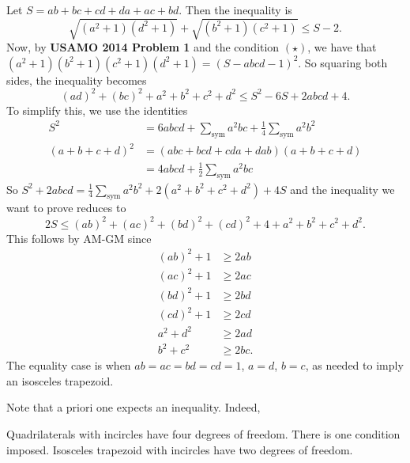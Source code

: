 \documentclass[11pt]{scrartcl}
\begin{document}
Let $S = ab+bc+cd+da+ac+bd$. Then the inequality is
\[ \sqrt{(a^2+1)(d^2+1)} + \sqrt{(b^2+1)(c^2+1)} \le S - 2. \]
Now, by \textbf{USAMO 2014 Problem 1} and the condition $(\star)$,
we have that $(a^2+1)(b^2+1)(c^2+1)(d^2+1) = (S - abcd - 1)^2$.
So squaring both sides, the inequality becomes
\[ (ad)^2+(bc)^2 + a^2+b^2+c^2+d^2 \le S^2 - 6S + 2abcd + 4. \]
To simplify this, we use the identities
\begin{align*}
  S^2 &= 6abcd + \sum_{\text{sym}} a^2bc
    + \frac14\sum_{\text{sym}} a^2b^2 \\
  (a+b+c+d)^2 &= (abc+bcd+cda+dab)(a+b+c+d) \\
  &= 4abcd + \frac12\sum_{\text{sym}} a^2bc
\end{align*}
So $S^2+2abcd = \frac14\textstyle\sum_{\text{sym}}
  a^2b^2 + 2(a^2+b^2+c^2+d^2) + 4S$
and the inequality we want to prove reduces to
\[ 2S \le (ab)^2+(ac)^2+(bd)^2+(cd)^2 + 4 + a^2 + b^2 + c^2 + d^2. \]
This follows by AM-GM since
\begin{align*}
  (ab)^2 + 1 &\ge 2ab \\
  (ac)^2 + 1 &\ge 2ac \\
  (bd)^2 + 1 &\ge 2bd \\
  (cd)^2 + 1 &\ge 2cd \\
  a^2 + d^2 &\ge 2ad \\
  b^2 + c^2 &\ge 2bc.
\end{align*}
The equality case is when $ab=ac=bd=cd=1$, $a=d$, $b=c$,
as needed to imply an isosceles trapezoid.

\begin{remark*}
Note that a priori one expects an inequality.
Indeed,
\begin{itemize}
  \ii Quadrilaterals with incircles have four degrees of freedom.
  \ii There is one condition imposed.
  \ii Isosceles trapezoid with incircles have two degrees of freedom.
\end{itemize}
\end{remark*}
\pagebreak
\end{document}
